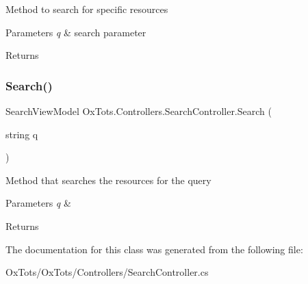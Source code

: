 Method to search for specific resources 


\begin{DoxyParams}{Parameters}
{\em q} & search parameter\\
\hline
\end{DoxyParams}
\begin{DoxyReturn}{Returns}

\end{DoxyReturn}
\mbox{\label{class_ox_tots_1_1_controllers_1_1_search_controller_a280d4f9b78f3ec664bee0cf52b7d68e1}} 
\subsubsection{\texorpdfstring{Search()}{Search()}}
{\footnotesize\ttfamily Search\+View\+Model Ox\+Tots.\+Controllers.\+Search\+Controller.\+Search (\begin{DoxyParamCaption}\item[{string}]{q }\end{DoxyParamCaption})\hspace{0.3cm}{\ttfamily [inline]}}



Method that searches the resources for the query 


\begin{DoxyParams}{Parameters}
{\em q} & \\
\hline
\end{DoxyParams}
\begin{DoxyReturn}{Returns}

\end{DoxyReturn}


The documentation for this class was generated from the following file\+:\begin{DoxyCompactItemize}
\item 
Ox\+Tots/\+Ox\+Tots/\+Controllers/Search\+Controller.\+cs\end{DoxyCompactItemize}
